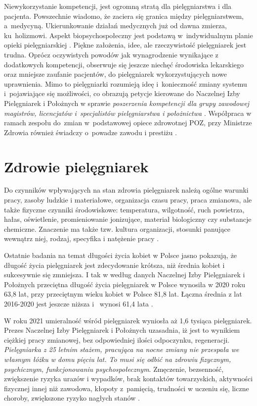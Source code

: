 \documentclass[a4paper,12pt,twoside,openright]{mwrep}
\begin{document}
Niewykorzystanie  kompetencji, jest ogromną stratą dla pielęgniarstwa i dla pacjenta. Powszechnie wiadomo, że zaciera się granica między pielęgniarstwem, a~medycyną. Ukierunkowanie działań medycznych już od dawna zmierza, ku~holizmowi. Aspekt biopsychospołeczny jest podstawą w~indywidualnym planie opieki pielęgniarskiej \cite{dorota}. Piękne założenia, idee, ale rzeczywistość pielęgniarek jest trudna. Oprócz oczywistych powodów jak wynagrodzenie wynikające z dodatkowych kompetencji, obserwuje się jeszcze niechęć środowiska lekarskiego oraz mniejsze zaufanie pacjentów, do pielęgniarek wykorzystujących nowe uprawnienia. Mimo to pielęgniarki rozumieją ideę i~konieczność zmiany systemu i~pojawiające się możliwości, co obrazują petycje kierowane do Naczelnej Izby Pielęgniarek i Położnych w sprawie \textit{poszerzenia kompetencji dla grupy zawodowej magistrów, licencjatów i~specjalistów pielęgniarstwa i położnictwa} \cite{petycja}. Współpraca w ramach zespołu do~zmian w~podstawowej opiece zdrowotnej POZ, przy Ministrze Zdrowia również świadczy o~powadze zawodu i prestiżu \cite{poz}.

\section{Zdrowie pielęgniarek}
\label{sectionZdrowiePielegniarek}
Do czynników wpływających na stan zdrowia pielęgniarek należą ogólne warunki pracy, zasoby ludzkie i materiałowe, organizacja czasu pracy,  praca zmianowa, ale także fizyczne czynniki środowiskowe: temperatura, wilgotność, ruch powietrza, hałas, oświetlenie, promieniowanie jonizujące, materiał biologiczny czy substancje chemiczne. Znaczenie ma także tzw. kultura organizacji, stosunki panujące wewnątrz niej, rodzaj, specyfika i natężenie pracy \cite{obciazenia}.

Ostatnie badania na temat długości życia kobiet w Polsce jasno pokazują, że długość życia pielęgniarek jest zdecydowanie krótsza, niż średnia kobiet i sukcesywnie się zmniejsza. I tak w według danych Naczelnej Izby Pielęgniarek i Położnych przeciętna długość życia pielęgniarek w Polsce wynosiła w 2020 roku 63,8 lat, przy przeciętnym wieku kobiet w Polsce 81,8 lat. Łączna średnia z lat 2016-2020 jest jeszcze niższa i~ wynosi 61,4 lata \cite{statystyka}.

W roku 2021 umieralność wśród pielęgniarek wyniosła aż 1,6 tysiąca pielęgniarek. Prezes Naczelnej Izby Pielęgniarek i Położnych uzasadnia, iż jest to wynikiem ciężkiej pracy zmianowej, bez odpowiedniej ilości odpoczynku, regeneracji.\textit{ Pielęgniarka z 25 letnim stażem, pracująca na nocne zmiany nie przespała we własnym łóżku w domu pięciu lat. To musi się odbić na zdrowiu fizycznym, psychicznym, funkcjonowaniu psychospołecznym}. Zmęczenie, bezsenność, zwiększenie ryzyka urazów i wypadków, brak kontaktów towarzyskich, aktywności fizycznej innej niż zawodowa, kłopoty z~pamięcią, trudności w uczeniu się, liczne choroby, zwiększone ryzyko nagłych stanów \cite{zgony}.
\end{document}
